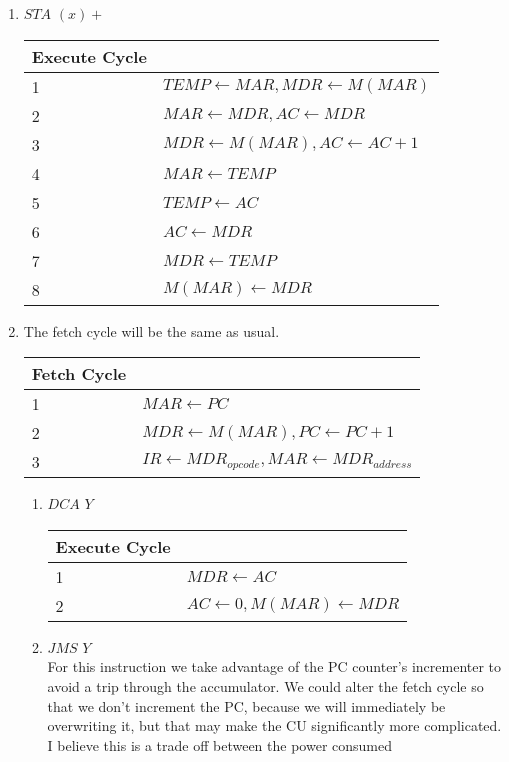 \documentclass[12pt,letterpaper]{article}
\begin{document}
\begin{enumerate}
    \item $STA$ $(x)+$\\
    \begin{tabular}{l l}
    Execute Cycle\\
    \hline
        1 & $TEMP \leftarrow MAR, MDR \leftarrow M(MAR)$\\
        2 & $MAR \leftarrow MDR, AC \leftarrow MDR$\\
        3 & $MDR \leftarrow M(MAR), AC \leftarrow AC + 1$\\
        4 & $MAR \leftarrow TEMP$\\
        5 & $TEMP \leftarrow AC$\\
        6 & $AC \leftarrow MDR$\\
        7 & $MDR \leftarrow TEMP$\\
        8 & $M(MAR) \leftarrow MDR$\\
    \end{tabular}
    \item The fetch cycle will be the same as usual.\\
    \begin{tabular}{l l}
    Fetch Cycle\\
    \hline
        1 & $MAR \leftarrow PC$\\
        2 & $MDR \leftarrow M(MAR), PC \leftarrow PC + 1$\\
        3 & $IR \leftarrow MDR_{opcode}, MAR \leftarrow MDR_{address}$\\
    \end{tabular}
    \begin{enumerate}
        \item $DCA$ $ Y$ \\
        \begin{tabular}{l l}
        Execute Cycle\\
        \hline
            1 & $MDR \leftarrow AC$\\
            2 & $AC \leftarrow 0, M(MAR) \leftarrow MDR$\\
        \end{tabular}
        \item $JMS $ $Y$ \\
        For this instruction we take advantage of the PC counter's incrementer
        to avoid a trip through the accumulator. We could alter the fetch cycle
        so that we don't increment the PC, because we will immediately be
        overwriting it, but that may make the CU significantly more
        complicated. I believe this is a trade off between the power consumed

\end{enumerate}
\end{enumerate}
\end{document}
